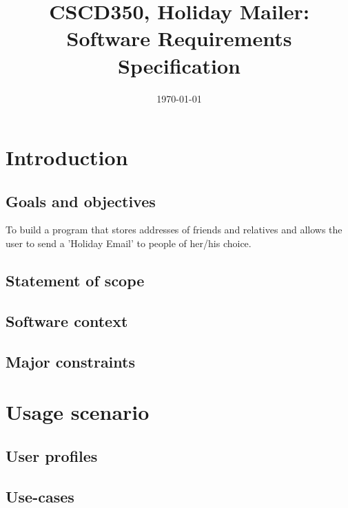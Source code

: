\documentclass{article}
\title{CSCD350, Holiday Mailer: Software Requirements Specification}
\date{\today}
\begin{document}
\section{Introduction}

\subsection{Goals and objectives}
To build a program that stores addresses of friends and relatives and allows the user to send a 'Holiday Email' to people of her/his choice.

\subsection{Statement of scope}

\subsection{Software context}

\subsection{Major constraints}

\section{Usage scenario}

\subsection{User profiles}

\subsection{Use-cases}
\end{document}
